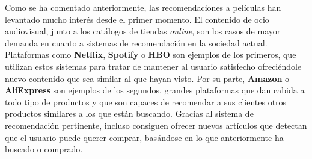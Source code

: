 Como se ha comentado anteriormente, las recomendaciones a películas han levantado mucho interés desde el primer momento. El contenido de ocio audiovisual, junto a los catálogos de tiendas \textit{online}, son los casos de mayor demanda en cuanto a sistemas de recomendación en la sociedad actual. Plataformas como \textbf{Netflix}, \textbf{Spotify} o \textbf{HBO} son ejemplos de los primeros, que utilizan estos sistemas para tratar de mantener al usuario satisfecho ofreciéndole nuevo contenido que sea similar al que hayan visto. Por su parte, \textbf{Amazon} o \textbf{AliExpress} son ejemplos de los segundos, grandes plataformas que dan cabida a todo tipo de productos y que son capaces de recomendar a sus clientes otros productos similares a los que están buscando. Gracias al sistema de recomendación pertinente, incluso consiguen ofrecer nuevos artículos que detectan que el usuario puede querer comprar, basándose en lo que anteriormente ha buscado o comprado.
